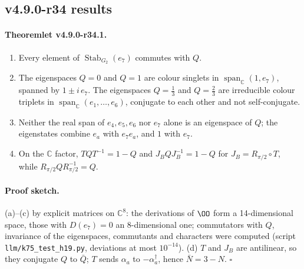 \subsection*{v4.9.0-r34 results}
\label{subsec:v490-r34-results}

\paragraph{Theoremlet v4.9.0-r34.1.}
\begin{enumerate}[leftmargin=2em]
\item[(a)] Every element of \(\operatorname{Stab}_{G_2}(e_7)\) commutes with \(Q\).
\item[(b)] The eigenspaces \(Q=0\) and \(Q=1\) are colour singlets in \(\operatorname{span}_{\mathbb C}(1,e_7)\), spanned by
\(1\pm i\,e_7\).  The eigenspaces \(Q=\tfrac13\) and \(Q=\tfrac23\) are irreducible colour triplets in
\(\operatorname{span}_{\mathbb C}(e_1,\dots,e_6)\), conjugate to each other and not self-conjugate.
\item[(c)] Neither the real span of \(e_4,e_5,e_6\) nor \(e_7\) alone is an eigenspace of \(Q\); the eigenstates combine
\(e_a\) with \(e_7e_a\), and \(1\) with \(e_7\).
\item[(d)] On the \(\mathbb C\) factor, \(TQT^{-1}=1-Q\) and \(J_BQJ_B^{-1}=1-Q\) for \(J_B=R_{\pi/2}\circ T\), while
\(R_{\pi/2}QR_{\pi/2}^{-1}=Q\).
\end{enumerate}

\paragraph{Proof sketch.}
(a)--(c) by explicit matrices on \(\mathbb C^8\): the derivations of \(\OO\) form a 14-dimensional space, those with
\(D(e_7)=0\) an 8-dimensional one; commutators with \(Q\), invariance of the eigenspaces, commutants and characters were
computed (script \texttt{llm/k75\_test\_h19.py}, deviations at most \(10^{-14}\)).  (d) \(T\) and \(J_B\) are antilinear, so they
conjugate \(Q\) to \(\bar Q\); \(T\) sends \(\alpha_a\) to \(-\alpha_a^\dagger\), hence \(\bar N=3-N\).  \(\square\)

